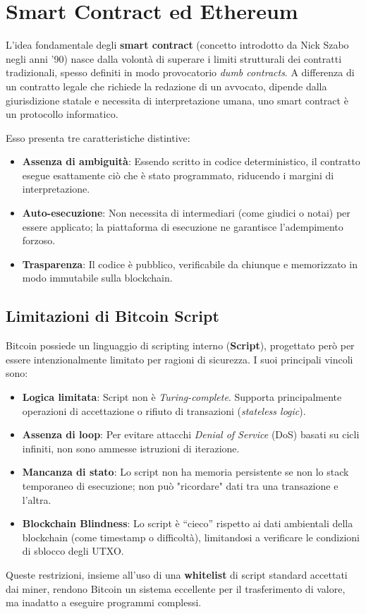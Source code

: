 \chapter{Smart Contract ed Ethereum}

L'idea fondamentale degli \textbf{smart contract} (concetto introdotto da Nick Szabo negli anni '90) nasce dalla volontà di superare i limiti strutturali dei contratti tradizionali, spesso definiti in modo provocatorio \textit{dumb contracts}. A differenza di un contratto legale che richiede la redazione di un avvocato, dipende dalla giurisdizione statale e necessita di interpretazione umana, uno smart contract è un protocollo informatico. 

Esso presenta tre caratteristiche distintive:
\begin{itemize}
    \item \textbf{Assenza di ambiguità}: Essendo scritto in codice deterministico, il contratto esegue esattamente ciò che è stato programmato, riducendo i margini di interpretazione.
    \item \textbf{Auto-esecuzione}: Non necessita di intermediari (come giudici o notai) per essere applicato; la piattaforma di esecuzione ne garantisce l'adempimento forzoso.
    \item \textbf{Trasparenza}: Il codice è pubblico, verificabile da chiunque e memorizzato in modo immutabile sulla blockchain.
\end{itemize}

\section{Limitazioni di Bitcoin Script}
Bitcoin possiede un linguaggio di scripting interno (\textbf{Script}), progettato però per essere intenzionalmente limitato per ragioni di sicurezza. I suoi principali vincoli sono:
\begin{itemize}
    \item \textbf{Logica limitata}: Script non è \textit{Turing-complete}. Supporta principalmente operazioni di accettazione o rifiuto di transazioni (\textit{stateless logic}).
    \item \textbf{Assenza di loop}: Per evitare attacchi \textit{Denial of Service} (DoS) basati su cicli infiniti, non sono ammesse istruzioni di iterazione.
    \item \textbf{Mancanza di stato}: Lo script non ha memoria persistente se non lo stack temporaneo di esecuzione; non può "ricordare" dati tra una transazione e l'altra.
    \item \textbf{Blockchain Blindness}: Lo script è ``cieco'' rispetto ai dati ambientali della blockchain (come timestamp o difficoltà), limitandosi a verificare le condizioni di sblocco degli UTXO.
\end{itemize}
Queste restrizioni, insieme all'uso di una \textbf{whitelist} di script standard accettati dai miner, rendono Bitcoin un sistema eccellente per il trasferimento di valore, ma inadatto a eseguire programmi complessi.

